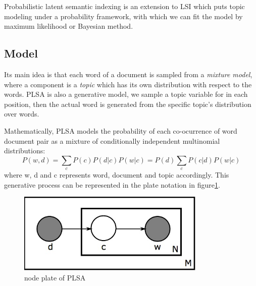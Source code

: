 Probabilistic latent semantic indexing\cite{hofmann1999probabilistic} is an extension to LSI which puts topic modeling under a probability framework, with which we can fit the model by maximum likelihood or Bayesian method.

\subsection{Model}
Its main idea is that each word of a document is sampled from a \emph{mixture model}, where a component is a \emph{topic} which has its own distribution with respect to the words. PLSA is also a generative model, we sample a topic variable for in each position, then the actual word is generated from the specific topic's distribution over words. 

Mathematically, PLSA models the probability of each co-ocurrence of word document pair as a mixture of conditionally independent multinomial distributions:
\begin{equation}
P(w, d) = \sum_cP(c)P(d|c)P(w|c) = P(d)\sum_cP(c|d)P(w|c)
\end{equation}
where w, d and c represents word, document and topic accordingly. This generative process can be represented in the plate notation in figure\ref{fig:plsa}.

\begin{figure}[!htbf]
\begin{center}
	\centering
	\includegraphics[width=0.8\textwidth]{FIG/plsa.png}
\caption{node plate of PLSA}
\label{fig:plsa}
\end{center}
\end{figure}



